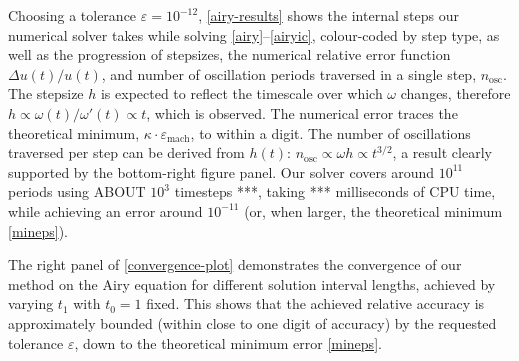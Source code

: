 \documentclass[10pt]{article}
\newcommand{\veps}{\varepsilon}
\newcommand{\om}{\omega}
\newcommand{\AB}[1]{{\color{orange}#1}}
\begin{document}
Choosing a tolerance $\veps=10^{-12}$,
\cref{airy-results} shows the
internal steps our numerical solver takes while solving
\eqref{airy}--\eqref{airyic},
colour-coded by step type, as well as the progression of stepsizes,
the numerical relative error function $\Delta u(t)/u(t)$,
and number of oscillation periods traversed in a single step,
$n_{\text{osc}}$.
The
stepsize $h$ is expected to reflect the timescale over which $\om$ changes,
therefore $h \propto \om(t)/\om'(t) \propto t$, which is observed.
The numerical
error traces the theoretical minimum, $\kappa \cdot \varepsilon_{\text{mach}}$, to
within a digit. The number of oscillations traversed per step can be derived
from $h(t)$: $n_{\text{osc}} \propto \om h \propto t^{3/2}$,
a result clearly supported by the bottom-right figure panel.
Our solver covers around $10^{11}$ periods using ABOUT $10^3$ timesteps ***,
taking *** milliseconds of CPU time,
while achieving an error around $10^{-11}$ (or, when larger, the theoretical
minimum \eqref{mineps}).

The right panel of \cref{convergence-plot} demonstrates the convergence
of our method on the Airy equation for different solution interval lengths,
achieved by varying $t_1$ with $t_0=1$ fixed.
This shows that the achieved relative accuracy is approximately bounded
(within close to one digit of accuracy)
by the requested tolerance $\varepsilon$,
down to the theoretical minimum error \eqref{mineps}.
\end{document}
